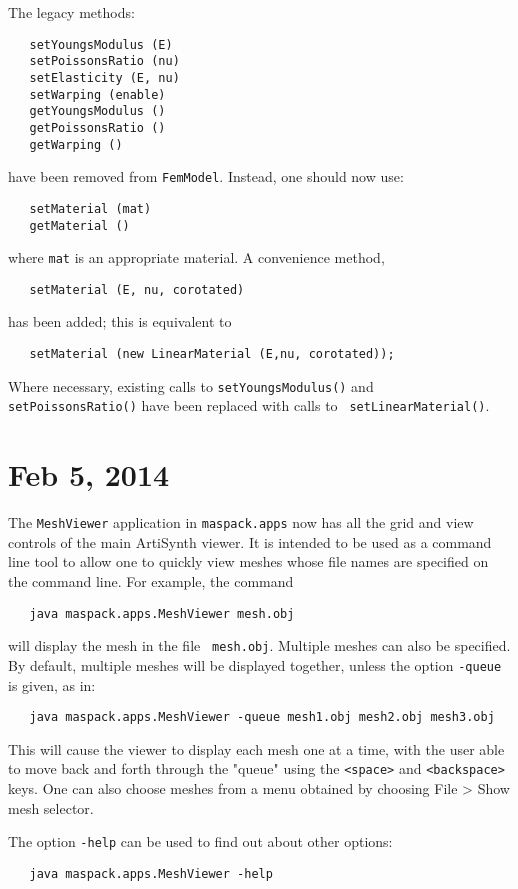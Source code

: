 \documentclass{article}
\begin{document}
The legacy methods: 
\begin{lstlisting}
   setYoungsModulus (E)
   setPoissonsRatio (nu)
   setElasticity (E, nu)
   setWarping (enable)
   getYoungsModulus ()
   getPoissonsRatio ()
   getWarping ()
\end{lstlisting}
have been removed from {\tt FemModel}. Instead, one should now use:
\begin{lstlisting}
   setMaterial (mat)
   getMaterial ()
\end{lstlisting}
where {\tt mat} is an appropriate material.
A convenience method, 
\begin{lstlisting}
   setMaterial (E, nu, corotated)
\end{lstlisting}
has been added; this is equivalent to
\begin{lstlisting}
   setMaterial (new LinearMaterial (E,nu, corotated));
\end{lstlisting}

Where necessary, existing calls to {\tt setYoungsModulus()} and {\tt
setPoissonsRatio()} have been replaced with calls to {\tt
setLinearMaterial()}.

\section*{Feb 5, 2014}

The {\tt MeshViewer} application in {\tt maspack.apps} now has all the
grid and view controls of the main ArtiSynth viewer. It is intended to
be used as a command line tool to allow one to quickly view
meshes whose file names are specified on the command line.
For example, the command
\begin{verbatim}
   java maspack.apps.MeshViewer mesh.obj 
\end{verbatim}
will display the mesh in the file {\tt
mesh.obj}. Multiple meshes can also be specified. By default,
multiple meshes will be displayed together, 
unless the option {\tt -queue} is given, as in:
\begin{verbatim}
   java maspack.apps.MeshViewer -queue mesh1.obj mesh2.obj mesh3.obj 
\end{verbatim}
This will cause the viewer to display each mesh one at a time, with
the user able to move back and forth through the "queue" using the
{\tt <space>} and {\tt <backspace>} keys. One can also choose meshes
from a menu obtained by choosing {\sf File > Show mesh selector}.

The option {\tt -help} can be used to find out about other options:
\begin{verbatim}
   java maspack.apps.MeshViewer -help
\end{verbatim}
\end{document}
